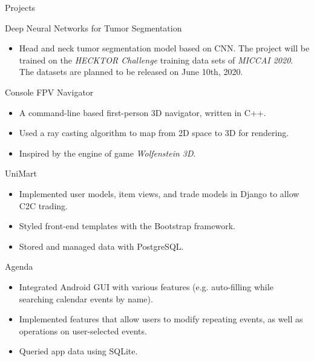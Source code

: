 \documentclass{article}
\newlength{\tabin}
\newlength{\secsep}
\newcommand{\lineunder}{\vspace*{-8pt} \\ \hspace*{-6pt} \hrulefill \\ \vspace*{-15pt}}
\newenvironment{tabbedsection}[1]{
  \begin{list}{}{
      \setlength{\itemsep}{0pt}
      \setlength{\labelsep}{0pt}
      \setlength{\labelwidth}{0pt}
      \setlength{\leftmargin}{\tabin}
      \setlength{\rightmargin}{\tabin}
      \setlength{\listparindent}{0pt}
      \setlength{\parsep}{0pt}
      \setlength{\parskip}{0pt}
      \setlength{\partopsep}{0pt}
      \setlength{\topsep}{#1}
    }
  \item[]
}{\end{list}}
\newenvironment{resume_section}[1]{
  \filbreak
  \vspace{2\secsep}
  \textsc{\large#1}
  \lineunder
  \begin{tabbedsection}{\secsep}
}{\end{tabbedsection}}
\newenvironment{resume_subsection}[2][]{
  \textbf{#2} \hfill {\footnotesize #1} \hspace{2em}
  \begin{tabbedsection}{0.5\secsep}
}{\end{tabbedsection}}
\newenvironment{subitems}{
  \renewcommand{\labelitemi}{-}
  \begin{itemize}
      \setlength{\labelsep}{1em}
}{\end{itemize}}
\begin{document}
\begin{resume_section}{Projects}
  
 \begin{resume_subsection}{Deep Neural Networks for Tumor Segmentation}
    \begin{subitems}
      \item Head and neck tumor segmentation model based on CNN. The project will be trained on 
      the \textit{HECKTOR Challenge} training data sets of \textit{MICCAI 2020}. The datasets are planned to be released on June 10th, 2020. 
    \end{subitems}
  \end{resume_subsection}

 \begin{resume_subsection}[(June 2020)]{Console FPV Navigator}
    \begin{subitems}
    \item A command-line based first-person 3D navigator, written in C++.
    \item Used a ray casting algorithm to map from 2D space to 3D for rendering.
    \item Inspired by the engine of game \textit{Wolfenstein 3D}.
    \end{subitems}
  \end{resume_subsection}

   \begin{resume_subsection}{UniMart}
    \begin{subitems}
    \item Implemented user models, item views, and trade models in Django to allow C2C trading.
    \item Styled front-end templates with the Bootstrap framework.
    \item Stored and managed data with PostgreSQL.
    \end{subitems}
  \end{resume_subsection}

  \begin{resume_subsection}[(April 2020)]{Agenda}
    \begin{subitems}
      \item Integrated Android GUI with various features (e.g.
      auto-filling while searching calendar events by name).
      \item Implemented features that allow users to modify
      repeating events, as well as operations on user-selected events.
      \item Queried app data using SQLite.
    \end{subitems}
  \end{resume_subsection}


\end{resume_section}
  
\end{document}
